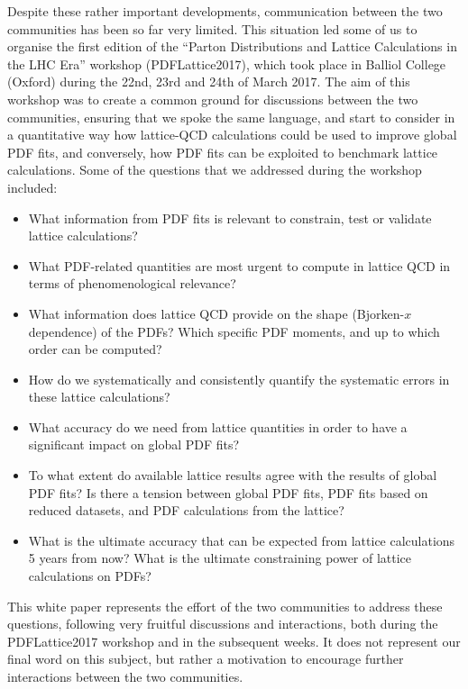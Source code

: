 Despite these rather important developments, communication between the
two communities has been so far very limited. This situation led some of us
to organise the first edition of the ``Parton Distributions and Lattice Calculations in the LHC Era''
workshop (PDFLattice2017), which took
place in Balliol College (Oxford) during the 22nd, 23rd and 24th of March 2017.
%
The aim of this workshop was to create a common ground for discussions
between the two communities, ensuring that we spoke the same language,
and start to consider in a quantitative way how lattice-QCD calculations could be used
to improve global PDF fits, and conversely, how PDF fits can be exploited to benchmark lattice calculations.
%
Some of the questions that we addressed during the workshop
included:
\begin{itemize}
\item What information from PDF fits is relevant to constrain, test or validate lattice calculations?

\item What PDF-related quantities are most urgent
  to compute in lattice QCD in terms of phenomenological relevance?

\item What information does lattice QCD provide on the
  shape (Bjorken-$x$ dependence) of the PDFs? Which specific
  PDF moments,
  and up to which order can be computed?
  
\item How do we systematically and consistently quantify the systematic errors in these lattice calculations?

\item What accuracy do we need from lattice quantities 
  in order to have a significant impact on global PDF fits?

\item To what extent do available lattice results agree with the results of
  global PDF fits? Is there a tension between global PDF fits, PDF
  fits based on reduced datasets, and PDF calculations from the lattice?

  \item What is the ultimate accuracy that can be expected from lattice
calculations 5 years from now? What is the ultimate
constraining power of lattice calculations on PDFs?

\end{itemize}

This white paper represents the effort of the two communities to address these questions, 
following very fruitful discussions and interactions, both during 
the PDFLattice2017 workshop and in the subsequent weeks.
%
It does not represent our final word on this subject, but rather a motivation to encourage further
interactions between the two communities.

